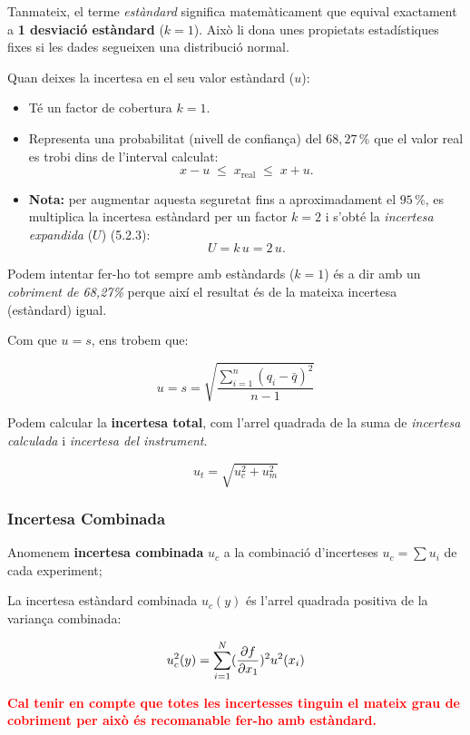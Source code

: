 \documentclass[12pt]{article}
\begin{document}
Tanmateix, el terme \emph{estàndard} significa matemàticament que equival exactament a \textbf{1 desviació estàndard} ($k = 1$).
Això li dona unes propietats estadístiques fixes si les dades segueixen una distribució normal.

Quan deixes la incertesa en el seu valor estàndard ($u$):

\begin{itemize}
  \item Té un factor de cobertura $k = 1$.
  \item Representa una probabilitat (nivell de confiança) del $68{,}27\,\%$ que el valor real es trobi dins de l'interval calculat:
        \[
          x - u \;\le\; x_{\text{real}} \;\le\; x + u .
        \]
  \item \textbf{Nota:} per augmentar aquesta seguretat fins a aproximadament el $95\,\%$, es multiplica la incertesa estàndard per un factor $k = 2$ i s'obté la \emph{incertesa expandida} ($U$) (5.2.3):
        \[
          U = k\,u = 2\,u .
        \]
\end{itemize}

Podem intentar fer-ho tot sempre amb estàndards ($k=1$) és a dir amb un \textit{cobriment de 68,27\%} perque així el resultat és de la mateixa incertesa (estàndard) igual.

Com que $u = s$, ens trobem que:

\[u = s = \sqrt{\frac{\sum_{i = 1}^{n}(q_i - \bar{q})^2}{n-1}}\]

Podem calcular la \textbf{incertesa total}, com l'arrel quadrada de la suma de \textit{incertesa calculada} i \textit{incertesa del instrument}.

\[u_t = \sqrt{u_c^2 + u_m^2}\]

\subsubsection{Incertesa Combinada}

Anomenem \textbf{incertesa combinada} $u_c$ a la combinació d'incerteses $u_c = \sum u_i$ de cada experiment;

La incertesa estàndard combinada $u_c(y)$ és l'arrel quadrada positiva de la variança combinada:

\[
  u_c^2(y) = \sum_{i = 1}^{N} (\pdv{f}{x_1})^2u^2(x_i)
\]

\textcolor{red}{\textbf{Cal tenir en compte que totes les incertesses tinguin el mateix grau de cobriment per això és recomanable fer-ho amb estàndard.}}
\end{document}
